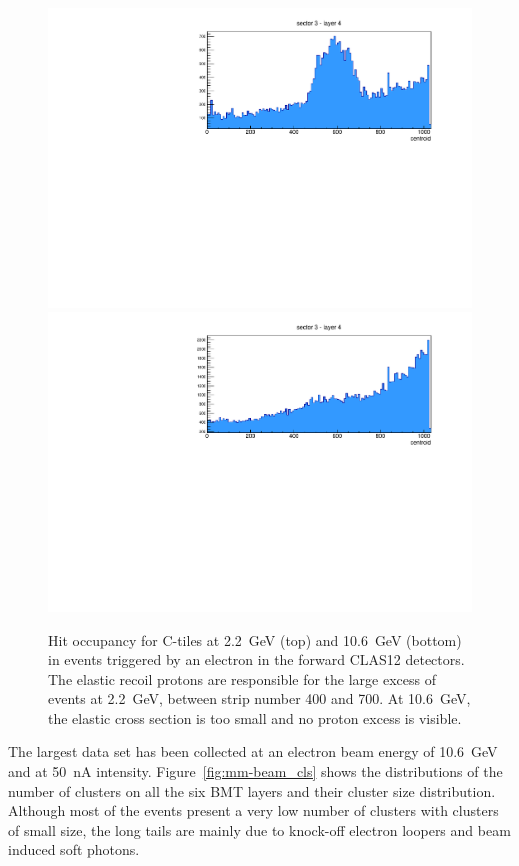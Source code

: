 \begin{figure}[htb]
 \includegraphics[width=1.0\columnwidth]{images/occupancy2GeV}
 \includegraphics[width=1.0\columnwidth]{images/occupancy10GeV}
 \caption{Hit occupancy for C-tiles at 2.2~GeV (top) and 10.6~GeV (bottom) in events triggered by an electron in the forward
   CLAS12 detectors. The elastic recoil protons are responsible for the large excess of events at 2.2~GeV, between strip number
   400 and 700. At 10.6~GeV, the elastic cross section is too small and no proton excess is visible.}
 \label{fig:mm-occupancy_22_10}
\end{figure}

The largest data set has been collected at an electron beam energy of 10.6~GeV and at 50~nA intensity.
Figure~\ref{fig:mm-beam_cls} shows the distributions of the number of clusters on all the six BMT layers and their cluster size
distribution. Although most of the events present a very low number of clusters with clusters of small size, the long tails are mainly
due to knock-off electron loopers and beam induced soft photons.

